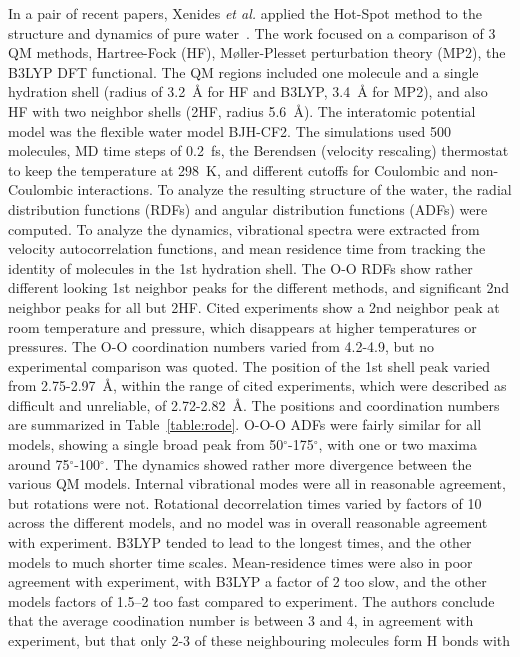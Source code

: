 \documentclass[11pt]{revtex4}
\begin{document}
In a pair of recent papers, Xenides {\it et al.} applied the Hot-Spot
method to the structure and dynamics of pure
water~\cite{xenides_j_chem_phys_2005a,xenides_j_mol_liq_2006a}.
The work focused on a comparison of 3 QM methods, Hartree-Fock (HF),
M{\o}ller-Plesset perturbation theory (MP2), the B3LYP DFT functional.
The QM regions included one molecule and a single hydration shell
(radius of 3.2~{\AA} for HF and B3LYP, 3.4~{\AA} for MP2), and also
HF with two neighbor shells (2HF, radius 5.6~{\AA}).  The interatomic
potential model was the flexible water model BJH-CF2.  The simulations
used 500 molecules, MD time steps of 0.2~fs, the Berendsen (velocity
rescaling) thermostat to keep the temperature at 298~K, and different
cutoffs for Coulombic and non-Coulombic interactions.  To analyze
the resulting structure of the water, the radial distribution
functions (RDFs) and angular distribution functions (ADFs) were
computed.  To analyze the dynamics, vibrational spectra were extracted
from velocity autocorrelation functions, and mean residence time
from tracking the identity of molecules in the 1st hydration shell.
The O-O RDFs show rather different looking 1st neighbor peaks for
the different methods, and significant 2nd neighbor peaks for all
but 2HF.  Cited experiments show a 2nd neighbor peak at room
temperature and pressure, which disappears at higher temperatures
or pressures.  The O-O coordination numbers varied from 4.2-4.9,
but no experimental comparison was quoted.  The position of the 1st
shell peak varied from 2.75-2.97~{\AA}, within the range of cited
experiments, which were described as difficult and unreliable, of
2.72-2.82~{\AA}.  The positions and coordination numbers are
summarized in Table~\ref{table:rode}.
O-O-O ADFs were fairly similar for all models,
showing a single broad peak from 50$^\circ$-175$^\circ$, with one
or two maxima around 75$^\circ$-100$^\circ$.  The dynamics showed
rather more divergence between the various QM models.  Internal
vibrational modes were all in reasonable agreement, but rotations
were not.  Rotational decorrelation times varied by factors of 10
across the different models, and no model was in overall reasonable
agreement with experiment.  B3LYP tended to lead to the longest
times, and the other models to much shorter time scales.  Mean-residence
times were also in poor agreement with experiment, with B3LYP a
factor of 2 too slow, and the other models factors of 1.5--2 too
fast compared to experiment.  The authors conclude that the average
coodination number is between 3 and 4, in agreement with experiment,
but that only 2-3 of these neighbouring molecules form H bonds with
\end{document}
